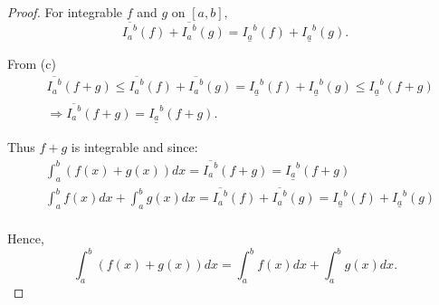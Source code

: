 \documentclass{article}
\begin{document}
\begin{proof}
    For integrable $f$ and $g$ on $[a, b],$
    \[
        \overline{{I_a}^b}(f) + \overline{{I_a}^b}(g) = \underline{{I_a}^b}(f) + \underline{{I_a}^b}(g).
    \]

    From (c)
    \[
        \begin{aligned}
            &\overline{{I_a}^b}(f+g) \le \overline{{I_a}^b}(f) + \overline{{I_a}^b}(g) = \underline{{I_a}^b}(f) + \underline{{I_a}^b}(g) \le \underline{{I_a}^b}(f+g)\\
            &\Rightarrow \overline{{I_a}^b}(f+g) = \underline{{I_a}^b}(f+g).
        \end{aligned}
    \]

    Thus $f+g$ is integrable and since:
    \[
        \begin{aligned}
            &\int_{a}^{b} (f(x) + g(x)) dx = \overline{{I_a}^b}(f+g) = \underline{{I_a}^b}(f+g)\\
            &\int_{a}^{b} f(x) dx + \int_{a}^{b} g(x) dx = \overline{{I_a}^b}(f) + \overline{{I_a}^b}(g) = \underline{{I_a}^b}(f) + \underline{{I_a}^b}(g)\\
        \end{aligned}
    \]

    Hence,
    \[
        \int_{a}^{b} (f(x) + g(x)) dx = \int_{a}^{b} f(x) dx + \int_{a}^{b} g(x) dx.
    \]
\end{proof}
\end{document}
